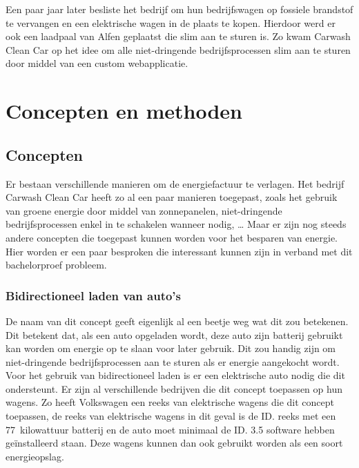 \pagebreak

Een paar jaar later besliste het bedrijf om hun bedrijfswagen op fossiele brandstof te vervangen en een elektrische wagen in de plaats te kopen. Hierdoor werd er ook een laadpaal van Alfen geplaatst die slim aan te sturen is. Zo kwam Carwash Clean Car op het idee om alle niet-dringende bedrijfsprocessen slim aan te sturen door middel van een custom webapplicatie.

\section{Concepten en methoden}
\label{sec:stand-van-zaken-concepten-methoden}

\subsection{Concepten}
\label{sec:stand-van-zaken-concepten}

Er bestaan verschillende manieren om de energiefactuur te verlagen. Het bedrijf Carwash Clean Car heeft zo al een paar manieren toegepast, zoals het gebruik van groene energie door middel van zonnepanelen, niet-dringende bedrijfsprocessen enkel in te schakelen wanneer nodig, … Maar er zijn nog steeds andere concepten die toegepast kunnen worden voor het besparen van energie. Hier worden er een paar besproken die interessant kunnen zijn in verband met dit bachelorproef probleem.

\subsubsection{Bidirectioneel laden van auto's}
\label{sec:stand-van-zaken-bidirectioneel-laden}

De naam van dit concept geeft eigenlijk al een beetje weg wat dit zou betekenen. Dit betekent dat, als een auto opgeladen wordt, deze auto zijn batterij gebruikt kan worden om energie op te slaan voor later gebruik. Dit zou handig zijn om niet-dringende bedrijfsprocessen aan te sturen als er energie aangekocht wordt.\\

Voor het gebruik van bidirectioneel laden is er een elektrische auto nodig die dit ondersteunt. Er zijn al verschillende bedrijven die dit concept toepassen op hun wagens. Zo heeft Volkswagen een reeks van elektrische wagens die dit concept toepassen, de reeks van elektrische wagens in dit geval is de ID. reeks met een 77~kilowattuur batterij en de auto moet minimaal de ID. 3.5 software hebben geïnstalleerd staan. Deze wagens kunnen dan ook gebruikt worden als een soort energieopslag.\\

